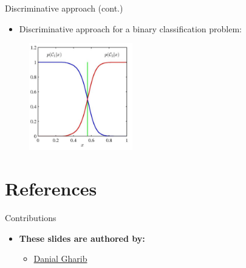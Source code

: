 \documentclass[serif, aspectratio=169]{beamer}
\begin{document}
\begin{frame}{Discriminative approach (cont.)}
    \begin{itemize}
        \item Discriminative approach for a binary classification problem:
    \end{itemize}
    \begin{figure}[h]
      \centering
      \includegraphics[width=0.4\textwidth]{pic/Disc.png}
      \end{figure}
    \vfill
\end{frame}




\section{References}

\begin{frame}{Contributions}
\begin{itemize}
\item \textbf{These slides are authored by:}
\begin{itemize}
    \setlength{\itemsep}{10pt} %
    \item \href{https://github.com/Danial-Gharib}{Danial Gharib}
\end{itemize}
\end{itemize}

\end{frame}

\begin{frame}[allowframebreaks]
    
    
    \nocite{*}
\end{frame}
\end{document}
